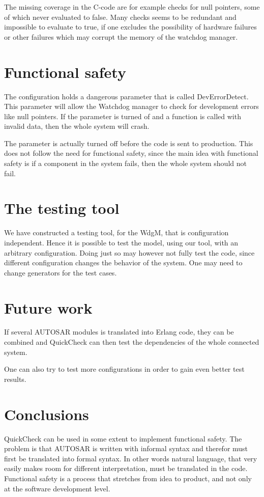 \documentclass[a4paper]{article}
\begin{document}
The missing coverage in the C-code are for example checks for null
pointers, some of which never evaluated to false. Many checks seems to be
redundant and impossible to evaluate to true, if one excludes the possibility
of hardware failures or other failures which may corrupt the memory of the
watchdog manager.

\section{Functional safety}
The configuration holds a dangerous parameter that is called
DevErrorDetect. This parameter will allow the Watchdog manager to
check for development errors like null pointers. If the parameter is
turned of and a function is called with invalid data, then the whole
system will crash.

The parameter is actually turned off before the code is sent to
production. This does not follow the need for functional safety, since
the main idea with functional safety is if a component in the system
fails, then the whole system should not fail.

\section{The testing tool}
We have constructed a testing tool, for the WdgM, that is configuration
independent. Hence it is possible to test the model, using our tool, with an
arbitrary configuration. Doing just so may however not fully test the code,
since different configuration changes the behavior of the system. One may need
to change generators for the test cases.

\section{Future work}
If several AUTOSAR modules is translated into Erlang code, they can be
combined and QuickCheck can then test the dependencies of the whole
connected system.

One can also try to test more configurations in order to gain even
better test results.


\section{Conclusions}
QuickCheck can be used in some extent to implement functional
safety. The problem is that AUTOSAR is written with informal syntax
and therefor must first be translated into formal syntax. In other words
natural language, that very easily makes room for different interpretation,
must be translated in the code.
Functional safety is a process that stretches from idea to product,
and not only at the software development level.
\end{document}
